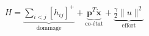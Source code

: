 \documentclass[preview]{standalone}
\begin{document}
\begin{align*}
H = \underbrace{\sum_{i<j}[h_{ij}]^+}_{\text{dommage}} + \underbrace{\mathbf{p}^T \dot{\mathbf{x}}}_{\text{co-état}} + \underbrace{\frac{\gamma}{2}\|u\|^2}_{\text{effort}}
\end{align*}
\end{document}
